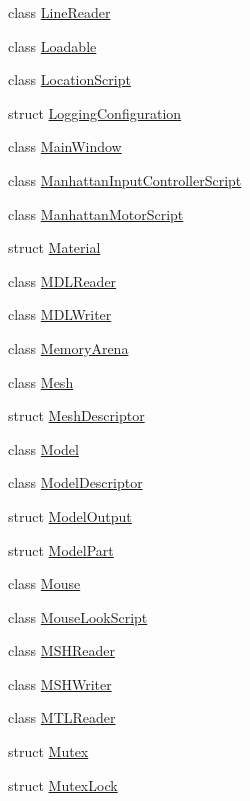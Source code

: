 \begin{DoxyCompactItemize}
\item 
class \hyperlink{classmage_1_1_line_reader}{Line\+Reader}
\item 
class \hyperlink{classmage_1_1_loadable}{Loadable}
\item 
class \hyperlink{classmage_1_1_location_script}{Location\+Script}
\item 
struct \hyperlink{structmage_1_1_logging_configuration}{Logging\+Configuration}
\item 
class \hyperlink{classmage_1_1_main_window}{Main\+Window}
\item 
class \hyperlink{classmage_1_1_manhattan_input_controller_script}{Manhattan\+Input\+Controller\+Script}
\item 
class \hyperlink{classmage_1_1_manhattan_motor_script}{Manhattan\+Motor\+Script}
\item 
struct \hyperlink{structmage_1_1_material}{Material}
\item 
class \hyperlink{classmage_1_1_m_d_l_reader}{M\+D\+L\+Reader}
\item 
class \hyperlink{classmage_1_1_m_d_l_writer}{M\+D\+L\+Writer}
\item 
class \hyperlink{classmage_1_1_memory_arena}{Memory\+Arena}
\item 
class \hyperlink{classmage_1_1_mesh}{Mesh}
\item 
struct \hyperlink{structmage_1_1_mesh_descriptor}{Mesh\+Descriptor}
\item 
class \hyperlink{classmage_1_1_model}{Model}
\item 
class \hyperlink{classmage_1_1_model_descriptor}{Model\+Descriptor}
\item 
struct \hyperlink{structmage_1_1_model_output}{Model\+Output}
\item 
struct \hyperlink{structmage_1_1_model_part}{Model\+Part}
\item 
class \hyperlink{classmage_1_1_mouse}{Mouse}
\item 
class \hyperlink{classmage_1_1_mouse_look_script}{Mouse\+Look\+Script}
\item 
class \hyperlink{classmage_1_1_m_s_h_reader}{M\+S\+H\+Reader}
\item 
class \hyperlink{classmage_1_1_m_s_h_writer}{M\+S\+H\+Writer}
\item 
class \hyperlink{classmage_1_1_m_t_l_reader}{M\+T\+L\+Reader}
\item 
struct \hyperlink{structmage_1_1_mutex}{Mutex}
\item 
struct \hyperlink{structmage_1_1_mutex_lock}{Mutex\+Lock}

\end{DoxyCompactItemize}
